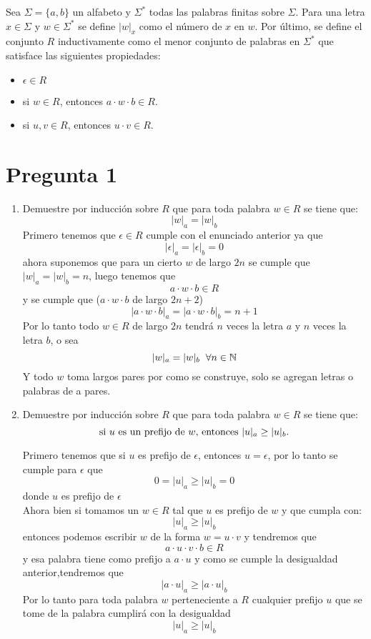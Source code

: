 \documentclass[letter]{article}
\begin{document}
	\begin{pregunta}{1} %
		Sea $\Sigma= \{a,b\}$ un alfabeto y $\Sigma^{*}$ todas las palabras finitas sobre $\Sigma$. Para una letra $x\in \Sigma$ y $w\in \Sigma^{*}$ se define $|w|_{x}$ como el número de $x$ en $w$. Por último, se define el conjunto $R$ inductivamente como el menor conjunto de palabras en $\Sigma^{*}$ que satisface las siguientes propiedades:
		\begin{itemize}
		\item $\epsilon \in R$
		\item si $w\in R$, entonces $a\cdot w \cdot b \in R$.
		\item si $u, v\in R$, entonces $u\cdot v\in R$.
		\end{itemize}
		\section*{Pregunta 1}
		\begin{enumerate}
		\item Demuestre por inducción sobre $R$ que para toda palabra $w\in R$ se tiene que:
		\begin{equation}\label{eq1}
		|w|_{a} = |w|_{b}
		\end{equation}
		Primero tenemos que $\epsilon\in R$ cumple con el enunciado anterior ya que 
		$$|\epsilon|_a = |\epsilon|_b = 0$$
		ahora suponemos que para un cierto $w$ de largo $2n$ se cumple que $|w|_a=|w|_b=n$, luego tenemos que 
		$$a\cdot w \cdot b \in R $$
		y se cumple que ($a\cdot w\cdot b$ de largo $2n+2$)
		$$|a\cdot w\cdot b|_a=|a\cdot w\cdot b|_b=n+1$$
		Por lo tanto todo $w\in R$ de largo $2n$ tendrá $n$ veces la letra $a$ y $n$ veces la letra $b$, o sea
		$$|w|_a=|w|_b\hspace*{2mm} \forall n\in \mathbb{N}$$
		Y todo $w$ toma largos pares por como se construye, solo se agregan letras o palabras de a pares.
		\item Demuestre por inducción sobre $R$ que para toda palabra $w\in R$ se tiene que:
		\begin{equation}\label{eq2}	
		\textup{si } u \textup{ es un prefijo de } w\textup{, entonces }|u|_{a}\geq |u|_{b}.
		\end{equation}
		
		Primero tenemos que si $u$ es prefijo de $\epsilon$, entonces $u=\epsilon$, por lo tanto se cumple para $\epsilon$ que 
		$$0=|u|_a\geq |u|_b=0$$ 
		donde $u$ es prefijo de $\epsilon$\\
		
		Ahora bien si tomamos un $w\in R$ tal que $u$ es prefijo de $w$ y que cumpla con:
		$$ |u|_a\geq |u|_b$$
		 entonces podemos escribir $w$ de la forma $w=u\cdot v$ y tendremos que 
		 $$ a\cdot u\cdot v \cdot b\in R$$
		 y esa palabra tiene como prefijo a $a\cdot u$ y como se cumple la desigualdad anterior,tendremos que 
		 $$ |a\cdot u|_a\geq |a\cdot u|_b$$
		 Por lo tanto para toda palabra $w$ perteneciente a $R$ cualquier prefijo $u$ que se tome de la palabra cumplirá con la desigualdad
		 $$ |u|_a\geq |u|_b$$
		\end{enumerate}
		
	\end{pregunta}
	
\end{document}
